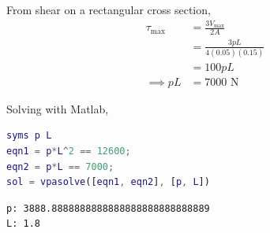 From shear on a rectangular cross section,
\begin{align*}
    \tau_{\max} &= \frac{3V_{\max}}{2A} \\
    &= \frac{3pL}{4(0.05)(0.15)} \\
    &= 100pL \\
    \implies pL &= 7000 \text{ N}
\end{align*}

Solving with Matlab,
\begin{lstlisting}[language=Matlab]
syms p L
eqn1 = p*L^2 == 12600;
eqn2 = p*L == 7000;
sol = vpasolve([eqn1, eqn2], [p, L])
\end{lstlisting}

\begin{verbatim}
p: 3888.8888888888888888888888888889
L: 1.8
\end{verbatim}